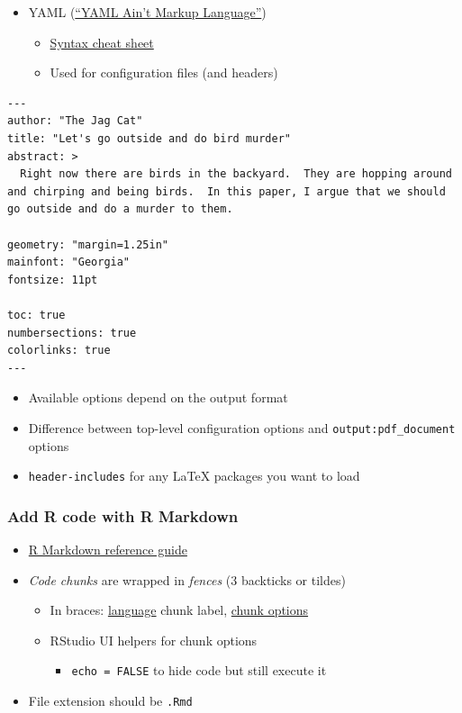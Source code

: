 \documentclass[
]{article}
\providecommand{\tightlist}{%
  \setlength{\itemsep}{0pt}\setlength{\parskip}{0pt}}
\begin{document}
\begin{itemize}
\tightlist
\item
  YAML (\href{https://en.wikipedia.org/wiki/YAML}{``YAML Ain't Markup Language''})

  \begin{itemize}
  \tightlist
  \item
    \href{https://yaml.org/refcard.html}{Syntax cheat sheet}
  \item
    Used for configuration files (and headers)
  \end{itemize}
\end{itemize}

\begin{verbatim}
---
author: "The Jag Cat"
title: "Let's go outside and do bird murder"
abstract: >
  Right now there are birds in the backyard.  They are hopping around and chirping and being birds.  In this paper, I argue that we should go outside and do a murder to them.  
  
geometry: "margin=1.25in"
mainfont: "Georgia"
fontsize: 11pt

toc: true
numbersections: true
colorlinks: true
---
\end{verbatim}

\begin{itemize}
\tightlist
\item
  Available options depend on the output format
\item
  Difference between top-level configuration options and \texttt{output:pdf\_document} options
\item
  \texttt{header-includes} for any LaTeX packages you want to load
\end{itemize}

\hypertarget{add-r-code-with-r-markdown}{%
\subsubsection{Add R code with R Markdown}\label{add-r-code-with-r-markdown}}

\begin{itemize}
\item
  \href{https://rstudio.com/wp-content/uploads/2015/03/RMarkdown-reference.pdf}{R Markdown reference guide}
\item
  \emph{Code chunks} are wrapped in \emph{fences} (3 backticks or tildes)

  \begin{itemize}
  \tightlist
  \item
    In braces: \href{https://rmarkdown.rstudio.com/lesson-5.html}{language} chunk label, \href{https://yihui.org/knitr/options/}{chunk options}
  \item
    RStudio UI helpers for chunk options

    \begin{itemize}
    \tightlist
    \item
      \texttt{echo\ =\ FALSE} to hide code but still execute it
    \end{itemize}
  \end{itemize}
\item
  File extension should be \texttt{.Rmd}
\end{itemize}
\end{document}
